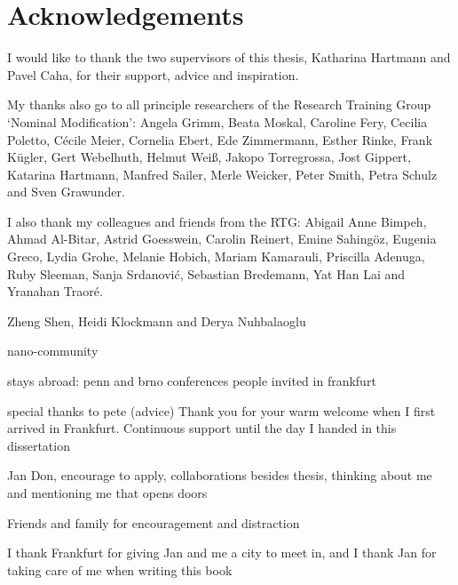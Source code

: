 
\chapter*[Acknowledgements]{Acknowledgements}

I would like to thank the two supervisors of this thesis, Katharina Hartmann and Pavel Caha, for their support, advice and inspiration.

My thanks also go to all principle researchers of the Research Training Group `Nominal Modification':
Angela Grimm,
Beata Moskal,
Caroline Fery,
Cecilia Poletto,
Cécile Meier,
Cornelia Ebert,
Ede Zimmermann,
Esther Rinke,
Frank Kügler,
Gert Webelhuth,
Helmut Weiß,
Jakopo Torregrossa,
Jost Gippert,
Katarina Hartmann,
Manfred Sailer,
Merle Weicker,
Peter Smith,
Petra Schulz and
Sven Grawunder.

I also thank my colleagues and friends from the RTG:
Abigail Anne Bimpeh,
Ahmad Al-Bitar,
Astrid Goesswein,
Carolin Reinert,
Emine Sahingöz,
Eugenia Greco,
Lydia Grohe,
Melanie Hobich,
Mariam Kamarauli,
Priscilla Adenuga,
Ruby Sleeman,
Sanja Srdanović,
Sebastian Bredemann,
Yat Han Lai and
Yranahan Traoré.


Zheng Shen,
Heidi Klockmann and
Derya Nuhbalaoglu

nano-community

stays abroad: penn and brno
conferences
people invited in frankfurt

special thanks to pete (advice)
Thank you for your warm welcome when I first arrived in Frankfurt. Continuous support until the day I handed in this dissertation

Jan Don, encourage to apply, collaborations besides thesis, thinking about me and mentioning me that opens doors

Friends and family for encouragement and distraction

I thank Frankfurt for giving Jan and me a city to meet in, and
I thank Jan for taking care of me when writing this book
